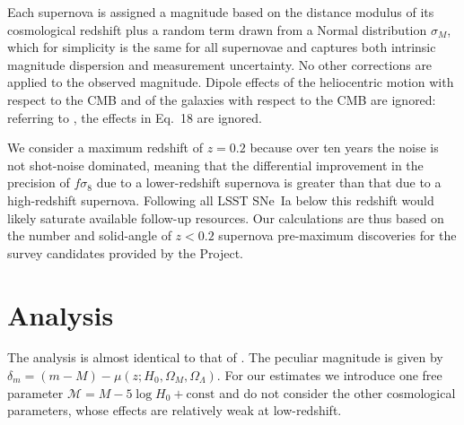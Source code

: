 \documentclass{aastex62}   	%
\begin{document}
Each supernova is assigned a magnitude based on the distance modulus of its cosmological
redshift plus a random term drawn from a Normal distribution $\sigma_M$, which for simplicity is the same for all supernovae and captures both
intrinsic magnitude dispersion and measurement uncertainty.  No other corrections are applied to the observed magnitude.  Dipole effects of the heliocentric
motion with respect to the CMB and of the galaxies with respect to the CMB  are ignored: referring to
\citet{2011ApJ...741...67D}, the effects in Eq.~18 are ignored.

We consider a maximum redshift of $z=0.2$ because over ten years the noise is not shot-noise dominated, meaning that the differential improvement
in the precision of
$f\sigma_8$ due to a lower-redshift supernova is greater than that due to a high-redshift supernova.  Following all LSST SNe~Ia below this redshift 
would likely saturate available follow-up resources.
Our calculations are thus based on the number and solid-angle of $z<0.2$ supernova pre-maximum discoveries 
for the survey candidates provided by the Project. 


\section{Analysis}
The analysis is  almost identical to that of \citet{2015JCAP...12..033H, 2017JCAP...05..015H}.  
The peculiar magnitude is given by $\delta_m=(m - M) - \mu(z;H_0, \Omega_M, \Omega_\Lambda)$.  For our estimates we introduce one free parameter 
$\mathcal{M} = M - 5\log{H_0} + \text{const}$ and do not consider the other cosmological parameters, whose effects are relatively weak at low-redshift.
\end{document}
